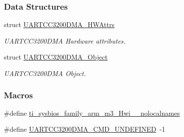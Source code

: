 \subsubsection*{Data Structures}
\begin{DoxyCompactItemize}
\item 
struct \hyperlink{struct_u_a_r_t_c_c3200_d_m_a___h_w_attrs}{U\-A\-R\-T\-C\-C3200\-D\-M\-A\-\_\-\-H\-W\-Attrs}
\begin{DoxyCompactList}\small\item\em U\-A\-R\-T\-C\-C3200\-D\-M\-A Hardware attributes. \end{DoxyCompactList}\item 
struct \hyperlink{struct_u_a_r_t_c_c3200_d_m_a___object}{U\-A\-R\-T\-C\-C3200\-D\-M\-A\-\_\-\-Object}
\begin{DoxyCompactList}\small\item\em U\-A\-R\-T\-C\-C3200\-D\-M\-A Object. \end{DoxyCompactList}\end{DoxyCompactItemize}
\subsubsection*{Macros}
\begin{DoxyCompactItemize}
\item 
\#define \hyperlink{_u_a_r_t_c_c3200_d_m_a_8h_aaa17ecf48f5762e2e1bdb0bab8aacf0c}{ti\-\_\-sysbios\-\_\-family\-\_\-arm\-\_\-m3\-\_\-\-Hwi\-\_\-\-\_\-nolocalnames}
\item 
\#define \hyperlink{_u_a_r_t_c_c3200_d_m_a_8h_a30cc7b6ae21e56f81bc4a9b4da8ad3b3}{U\-A\-R\-T\-C\-C3200\-D\-M\-A\-\_\-\-C\-M\-D\-\_\-\-U\-N\-D\-E\-F\-I\-N\-E\-D}~-\/1
\end{DoxyCompactItemize}
